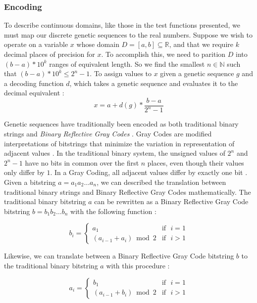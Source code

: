  \subsubsection*{Encoding}
To describe continuous domains, like those in the test functions presented, we must map our discrete genetic sequences to the real numbers. Suppose we wish to operate on a variable $x$ whose domain $D = [a,b] \subseteq \mathbb{R}$, and that we require $k$ decimal places of precision for $x$. To accomplish this, we need to parition $D$ into $(b - a) * 10^k$ ranges of equivalent length. So we find the smallest $n \in \mathbb{N}$ such that $(b - a) * 10^k \leq 2^n - 1$. To assign values to $x$ given a genetic sequence $g$ and a decoding function $d$, which takes a genetic sequence and evaluates it to the decimal equivalent \cite{Michalewicz98}:
\[ x = a + d(g) * \frac{b-a}{2^n - 1} \]

Genetic sequences have traditionally been encoded as both traditional binary strings and \emph{Binary Reflective Gray Codes} \cite{Whitley97}. Gray Codes are modified interpretations of bitstrings that minimize the variation in representation of adjacent values \cite{Back93}. In the traditional binary system, the unsigned values of $2^n$ and $2^n - 1$ have no bits in common over the first $n$ places, even though their values only differ by $1$. In a Gray Coding, all adjacent values differ by exactly one bit \cite{Michalewicz98}. Given a bitstring $a = a_1 a_2 \ldots a_n$, we can described the translation between traditional binary strings and Binary Reflective Gray Codes mathematically. The traditional binary bitstring $a$ can be rewritten as a Binary Reflective Gray Code bitstring $b =  b_1 b_2 \ldots b_n$ with the following function \cite{Back93}:

\begin{displaymath}
   b_i = \left\{
     \begin{array}{cr}
       a_1 & \text{if~ } i = 1 \\
       (a_{i-1} + a_i) \bmod{2} & \text{if~ } i > 1
     \end{array}
   \right.
\end{displaymath} 

Likewise, we can translate between a Binary Reflective Gray Code bitstring $b$ to the traditional binary bitstring $a$ with this procedure \cite{Back93}:

\begin{displaymath}
   a_i = \left\{
     \begin{array}{cr}
       b_1 & \text{if~ } i = 1 \\
       (a_{i-1} + b_i) \bmod{2} & \text{if~ } i > 1
     \end{array}
   \right.
\end{displaymath} 


